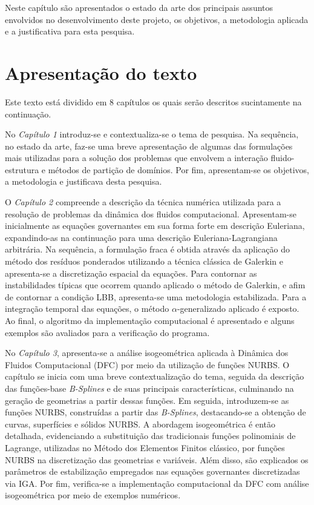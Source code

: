 \documentclass[tese_patricia.tex]{subfiles}
\begin{document}
Neste capítulo são apresentados o estado da arte dos principais assuntos envolvidos no desenvolvimento deste projeto, os objetivos, a metodologia aplicada e a justificativa para esta pesquisa.


\section{Apresentação do texto}

Este texto está dividido em 8 capítulos os quais serão descritos sucintamente na continuação.

No \textit{Capítulo 1} introduz-se e contextualiza-se o tema de pesquisa. Na sequência, no estado da arte, faz-se uma breve apresentação de algumas das formulações mais utilizadas para a solução dos problemas que envolvem a interação fluido-estrutura e métodos de partição de domínios. Por fim, apresentam-se os objetivos, a metodologia e justificava desta pesquisa.

O \textit{Capítulo 2} compreende a descrição da técnica numérica utilizada para a resolução de problemas da dinâmica dos fluidos computacional. 
Apresentam-se inicialmente as equações governantes em sua forma forte em descrição Euleriana, expandindo-as na continuação para uma descrição Euleriana-Lagrangiana arbitrária. Na sequência, a formulação fraca é obtida através da aplicação do método dos resíduos ponderados utilizando a técnica clássica de Galerkin e apresenta-se a discretização espacial da equações. Para contornar as instabilidades típicas que ocorrem quando aplicado o método de Galerkin, e afim de contornar a condição LBB, apresenta-se uma metodologia estabilizada. Para a integração temporal das equações, o método $\alpha$-generalizado aplicado é exposto. Ao final, o algoritmo da implementação computacional é apresentado e alguns exemplos são avaliados para a verificação do programa.

No \textit{Capítulo 3}, apresenta-se a análise isogeométrica aplicada à Dinâmica dos Fluidos Computacional (DFC) por meio da utilização de funções NURBS. O capítulo se inicia com uma breve contextualização do tema, seguida da descrição das funções-base \textit{B-Splines} e de suas principais características, culminando na geração de geometrias a partir dessas funções. Em seguida, introduzem-se as funções NURBS, construídas a partir das \textit{B-Splines}, destacando-se a obtenção de curvas, superfícies e sólidos NURBS. A abordagem isogeométrica é então detalhada, evidenciando a substituição das tradicionais funções polinomiais de Lagrange, utilizadas no Método dos Elementos Finitos clássico, por funções NURBS na discretização das geometrias e variáveis. Além disso, são explicados os parâmetros de estabilização empregados nas equações governantes discretizadas via IGA. Por fim, verifica-se a implementação computacional da DFC com análise isogeométrica por meio de exemplos numéricos.
\end{document}
